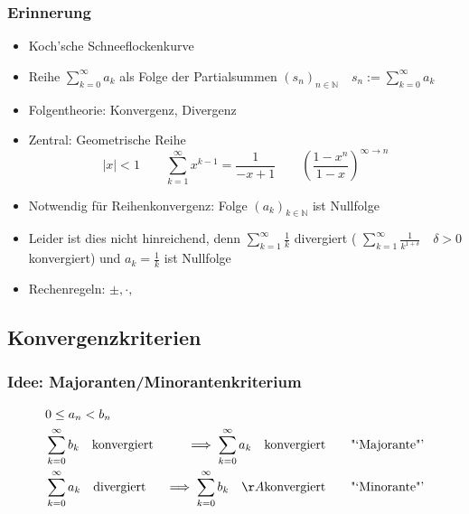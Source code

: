 

\subsubsection*{Erinnerung}
\begin{itemize}
	\item Koch'sche Schneeflockenkurve
	\item Reihe \( \sum_{k=0}^{\infty} a_k \) als Folge der Partialsummen \( (s_n)_{n \in \mathbb{N} } \quad s_n := \sum_{k=0}^{\infty}a_k \)
	\item Folgentheorie: Konvergenz, Divergenz
	\item Zentral: Geometrische Reihe \[
		|x|<1 \qquad \sum_{k=1}^{\infty} x^{k-1} = \frac{1}{-x+1} \qquad \left(\frac{1-x^n}{1-x}\right)^{\infty\rightarrow n}
	\]
	\item Notwendig für Reihenkonvergenz: Folge \( (a_k)_{k \in \mathbb{N}} \) ist Nullfolge
	\item Leider ist dies nicht hinreichend, denn \( \sum_{k=1}^{\infty} \frac{1}{k} \) divergiert ( \(\sum_{k=1}^{\infty}\frac{1}{k^{1+\delta}} \quad   \delta > 0 \) konvergiert) und \( a_k = \frac{1}{k} \) ist Nullfolge
	\item Rechenregeln: \( \pm, \cdot, \) 
\end{itemize}

\subsection*{Konvergenzkriterien}
\subsubsection*{Idee: Majoranten/Minorantenkriterium}
	
\begin{align*}
	& 0 \leq a_n < b_n & \\
	& \sum_{k=0}^{\infty}b_k \quad\text{konvergiert} &\implies \sum_{k=0}^{\infty} a_k \quad\text{konvergiert} \qquad \text{"`Majorante"'} \\
	& \sum_{k=0}^{\infty}a_k \quad\text{divergiert} &\implies \sum_{k=0}^{\infty} b_k \quadÅ\text{konvergiert} \qquad \text{"`Minorante"'}
\end{align*}

